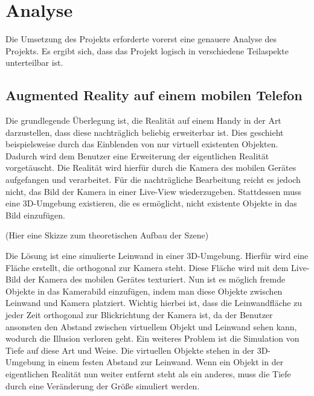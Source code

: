 \chapter{Analyse}
Die Umsetzung des Projekts erforderte vorerst eine genauere Analyse des Projekts. Es ergibt sich, dass das Projekt logisch in verschiedene Teilaspekte unterteilbar ist.

\section{Augmented Reality auf einem mobilen Telefon}
Die grundlegende Überlegung ist, die Realität auf einem Handy in der Art darzustellen, dass diese nachträglich beliebig erweiterbar ist. Dies geschieht beispielsweise durch das Einblenden von nur virtuell existenten Objekten. Dadurch wird dem Benutzer eine Erweiterung der eigentlichen Realität vorgetäuscht.
Die Realität wird hierfür durch die Kamera des mobilen Gerätes aufgefangen und verarbeitet. Für die nachträgliche Bearbeitung reicht es jedoch nicht, das Bild der Kamera in einer Live-View wiederzugeben. Stattdessen muss eine 3D-Umgebung existieren, die es ermöglicht, nicht existente Objekte in das Bild einzufügen.

(Hier eine Skizze zum theoretischen Aufbau der Szene)

Die Lösung ist eine simulierte Leinwand in einer 3D-Umgebung. Hierfür wird eine Fläche erstellt, die orthogonal zur Kamera steht. Diese Fläche wird mit dem Live-Bild der Kamera des mobilen Gerätes texturiert. Nun ist es möglich fremde Objekte in das Kamerabild einzufügen, indem man diese Objekte zwischen Leinwand und Kamera platziert. 
Wichtig hierbei ist, dass die Leinwandfläche zu jeder Zeit orthogonal zur Blickrichtung der Kamera ist, da der Benutzer ansonsten den Abstand zwischen virtuellem Objekt und Leinwand sehen kann, wodurch die Illusion verloren geht. Ein weiteres Problem ist die Simulation von Tiefe auf diese Art und Weise. Die virtuellen Objekte stehen in der 3D-Umgebung in einem festen Abstand zur Leinwand. Wenn ein Objekt in der eigentlichen Realität nun weiter entfernt steht als ein anderes, muss die Tiefe durch eine Veränderung der Größe simuliert werden.

